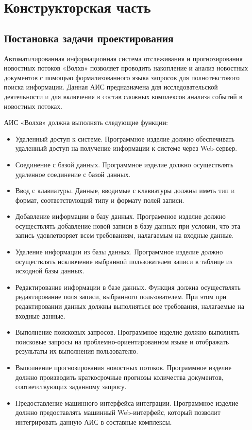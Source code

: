 \section{Конструкторская часть}

\subsection{Постановка задачи проектирования}

Автоматизированная информационная система отслеживания и прогнозирования новостных потоков «Волхв» позволяет проводить накопление и анализ новостных документов с помощью формализованного языка запросов для полнотекстового поиска информации. Данная АИС предназначена для исследовательской деятельности и для включения в состав сложных комплексов анализа событий в новостных потоках.

АИС «Волхв» должна выполнять следующие функции:
\begin{itemize}
\item Удаленный доступ к системе. Программное изделие должно обеспечивать удаленный доступ на получение информации к системе через Web-сервер.
\item Соединение с базой данных. Программное изделие должно осуществлять удаленное соединение с базой данных.
\item Ввод с клавиатуры. Данные, вводимые с клавиатуры должны иметь тип и формат, соответствующий типу и формату полей записи.
\item Добавление информации в базу данных. Программное изделие должно осуществлять добавление новой записи в базу данных при условии, что эта запись удовлетворяет всем требованиям, налагаемым на входные данные.
\item Удаление информации из базы данных. Программное изделие должно осуществлять исключение выбранной пользователем записи в таблице из исходной базы данных.
\item Редактирование информации в базе данных. Функция должна осуществлять редактирование поля записи, выбранного пользователем. При этом при редактировании данных должны выполняться все требования, налагаемые на входные данные.
\item Выполнение поисковых запросов. Программное изделие должно выполнять поисковые запросы на проблемно-ориентированном языке и отображать результаты их выполнения пользователю.
\item Выполнение прогнозирования новостных потоков. Программное изделие должно производить краткосрочные прогнозы количества документов, соответствующих заданному запросу.
\item Предоставление машинного интерфейса интеграции. Программное изделие должно предоставлять машинный Web-интерфейс, который позволит интегрировать данную АИС в составные комплексы.
\end{itemize}


